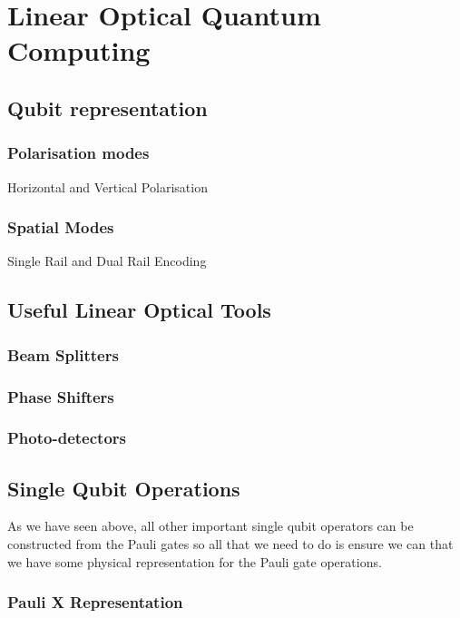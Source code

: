 \section{Linear Optical Quantum Computing}\label{sec:Photonic}

\subsection{Qubit representation}
\subsubsection{Polarisation modes}
Horizontal and Vertical Polarisation
\subsubsection{Spatial Modes}
Single Rail and Dual Rail Encoding



\subsection{Useful Linear Optical Tools}
\subsubsection{Beam Splitters}
\subsubsection{Phase Shifters}
\subsubsection{Photo-detectors}


\subsection{Single Qubit Operations}
As we have seen above, all other important single qubit operators can be constructed from the Pauli gates so all that we need to do is ensure we can that we have some physical representation for the Pauli gate operations.
\subsubsection{Pauli X Representation}
